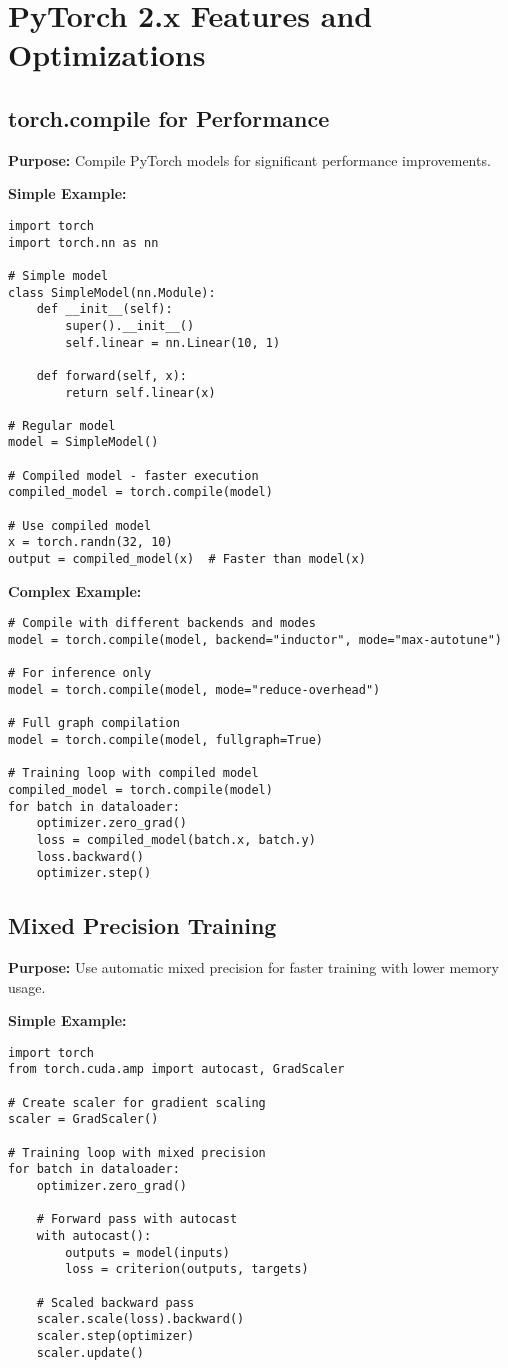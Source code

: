 \documentclass[11pt,a4paper]{book}
\begin{document}
\chapter{PyTorch 2.x Features and Optimizations}

\section{torch.compile for Performance}

\textbf{Purpose:} Compile PyTorch models for significant performance improvements.

\textbf{Simple Example:}
\begin{verbatim}
import torch
import torch.nn as nn

# Simple model
class SimpleModel(nn.Module):
    def __init__(self):
        super().__init__()
        self.linear = nn.Linear(10, 1)
    
    def forward(self, x):
        return self.linear(x)

# Regular model
model = SimpleModel()

# Compiled model - faster execution
compiled_model = torch.compile(model)

# Use compiled model
x = torch.randn(32, 10)
output = compiled_model(x)  # Faster than model(x)
\end{verbatim}

\textbf{Complex Example:}
\begin{verbatim}
# Compile with different backends and modes
model = torch.compile(model, backend="inductor", mode="max-autotune")

# For inference only
model = torch.compile(model, mode="reduce-overhead")

# Full graph compilation
model = torch.compile(model, fullgraph=True)

# Training loop with compiled model
compiled_model = torch.compile(model)
for batch in dataloader:
    optimizer.zero_grad()
    loss = compiled_model(batch.x, batch.y)
    loss.backward()
    optimizer.step()
\end{verbatim}

\section{Mixed Precision Training}

\textbf{Purpose:} Use automatic mixed precision for faster training with lower memory usage.

\textbf{Simple Example:}
\begin{verbatim}
import torch
from torch.cuda.amp import autocast, GradScaler

# Create scaler for gradient scaling
scaler = GradScaler()

# Training loop with mixed precision
for batch in dataloader:
    optimizer.zero_grad()
    
    # Forward pass with autocast
    with autocast():
        outputs = model(inputs)
        loss = criterion(outputs, targets)
    
    # Scaled backward pass
    scaler.scale(loss).backward()
    scaler.step(optimizer)
    scaler.update()
\end{verbatim}
\end{document}
